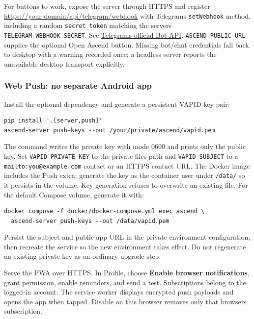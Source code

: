 For buttons to work, expose the server through HTTPS and register
\url{https://your-domain/api/telegram/webhook} with
Telegram\textquotesingle s \texttt{setWebhook} method, including a
random \texttt{secret\_token} matching the server\textquotesingle s
\texttt{TELEGRAM\_WEBHOOK\_SECRET}. See
\href{https://core.telegram.org/bots/api\#setwebhook}{Telegram\textquotesingle s
official Bot API}. \texttt{ASCEND\_PUBLIC\_URL} supplies the optional
Open Ascend button. Missing bot/chat credentials fall back to desktop
with a warning recorded once; a headless server reports the unavailable
desktop transport explicitly.

\hypertarget{web-push-no-separate-android-app}{%
\subsubsection{Web Push: no separate Android
app}\label{web-push-no-separate-android-app}}

Install the optional dependency and generate a persistent VAPID key
pair:

\begin{verbatim}
pip install '.[server,push]'
ascend-server push-keys --out /your/private/ascend/vapid.pem
\end{verbatim}

The command writes the private key with mode 0600 and prints only the
public key. Set \texttt{VAPID\_PRIVATE\_KEY} to the private
file\textquotesingle s path and \texttt{VAPID\_SUBJECT} to a
\texttt{mailto:you@example.com} contact or an HTTPS contact URL. The
Docker image includes the Push extra; generate the key as the container
user under \texttt{/data/} so it persists in the volume. Key generation
refuses to overwrite an existing file.
For the default Compose volume, generate it with:
\begin{verbatim}
docker compose -f docker/docker-compose.yml exec ascend \
  ascend-server push-keys --out /data/vapid.pem
\end{verbatim}
Persist the subject and public app URL in the private environment configuration,
then recreate the service so the new environment takes effect. Do not regenerate
an existing private key as an ordinary upgrade step.

Serve the PWA over HTTPS. In Profile, choose \textbf{Enable browser
notifications}, grant permission, enable reminders, and send a test.
Subscriptions belong to the logged-in account. The service worker
displays encrypted push payloads and opens the app when tapped. Disable
on this browser removes only that browser\textquotesingle s
subscription.

